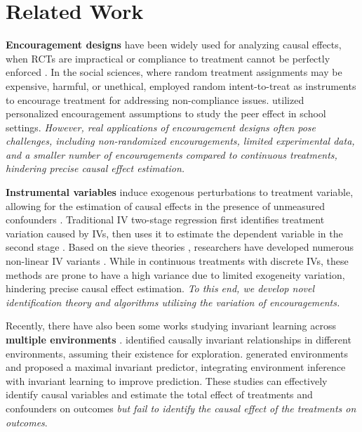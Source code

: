 \documentclass[journal]{IEEEtran}
\begin{document}
\section{Related Work}

\textbf{Encouragement designs} have been widely used for analyzing
causal effects, when RCTs are impractical or compliance to treatment cannot be perfectly enforced \cite{sexton1984clinical,permutt1989simultaneous,angrist1996identification,bang2007estimating}.
In the social sciences, where random treatment assignments may be expensive, harmful, or unethical, \cite{angrist1996identification,hirano2000assessing,bang2007estimating,kang2016peer} employed random intent-to-treat as instruments to encourage treatment for addressing non-compliance issues. \cite{fletcher2010social,an2015instrumental,kang2016peer} utilized personalized encouragement assumptions to study the peer effect in school settings. 
\emph{However, real applications of encouragement designs often pose challenges, including non-randomized encouragements, limited experimental data, and a smaller number of encouragements compared to continuous treatments, hindering precise causal effect estimation.}

\textbf{Instrumental variables} induce exogenous perturbations to treatment variable, allowing for the estimation of causal effects in the presence of unmeasured confounders \cite{hirano2000assessing, sovey2011instrumental,an2015instrumental,kang2016peer,cheng2023discovering,sun2024sequential,zhao2024networked}. 
Traditional IV two-stage regression first identifies treatment variation caused by IVs, then uses it to estimate the dependent variable in the second stage \cite{wald1940fitting,angrist1995identification,angrist1996identification}. Based on the sieve theories \cite{newey2003instrumental}, researchers have developed numerous non-linear IV variants \cite{hartford2017deep,singh2019kernel,muandet2020dual,2019deepgmm,lewis2020agmm,xu2020dfiv,wu2022instrumental}. 
While in continuous treatments with discrete IVs, these methods are prone to have a high variance due to limited exogeneity variation, hindering precise causal effect estimation. \emph{To this end, we develop novel identification theory and algorithms utilizing the variation of encouragements.}
 
Recently, there have also been some works studying invariant learning across \textbf{multiple environments} \cite{arjovsky2019invariant,duchi2021learning,creager2021environment,liu2021heterogeneous,liu2021kernelized,wang2023out}.
\cite{arjovsky2019invariant} identified causally invariant relationships in different environments, assuming their existence for exploration.
\cite{liu2021heterogeneous,liu2021kernelized} generated environments and proposed a maximal invariant predictor, integrating environment inference with invariant learning to improve prediction. These studies can effectively identify causal variables and estimate the total effect of treatments and confounders on outcomes \emph{but fail to identify the causal effect of the treatments on outcomes}.
\end{document}
